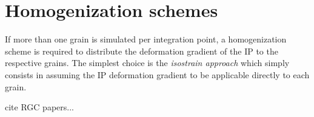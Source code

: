 \chapter{Homogenization schemes}

If more than one grain is simulated per integration point, a homogenization scheme is required to distribute the deformation gradient of the IP to the respective grains. The simplest choice is the \emph{isostrain approach} which simply consists in assuming the IP deformation gradient to be applicable directly to each grain. 

cite RGC papers...

